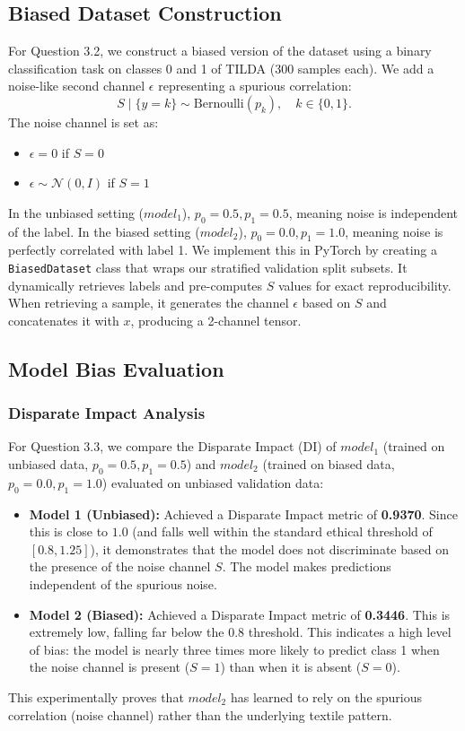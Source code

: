 \documentclass{name}
\begin{document}
\subsection{Biased Dataset Construction}
For Question 3.2, we construct a biased version of the dataset using a binary classification task on classes 0 and 1 of TILDA (300 samples each). We add a noise-like second channel $\epsilon$ representing a spurious correlation:
$$S \mid \{y = k\} \sim \text{Bernoulli}(p_k), \quad k \in \{0, 1\}.$$
The noise channel is set as:
\begin{itemize}
    \item $\epsilon = 0$ if $S = 0$
    \item $\epsilon \sim \mathcal{N}(0, I)$ if $S = 1$
\end{itemize}
In the unbiased setting ($model_1$), $p_0 = 0.5, p_1 = 0.5$, meaning noise is independent of the label. In the biased setting ($model_2$), $p_0 = 0.0, p_1 = 1.0$, meaning noise is perfectly correlated with label 1. We implement this in PyTorch by creating a \texttt{BiasedDataset} class that wraps our stratified validation split subsets. It dynamically retrieves labels and pre-computes $S$ values for exact reproducibility. When retrieving a sample, it generates the channel $\epsilon$ based on $S$ and concatenates it with $x$, producing a 2-channel tensor.

\subsection{Model Bias Evaluation}

\subsubsection{Disparate Impact Analysis}
For Question 3.3, we compare the Disparate Impact (DI) of $model_1$ (trained on unbiased data, $p_0=0.5, p_1=0.5$) and $model_2$ (trained on biased data, $p_0=0.0, p_1=1.0$) evaluated on unbiased validation data:
\begin{itemize}
    \item \textbf{Model 1 (Unbiased):} Achieved a Disparate Impact metric of \textbf{0.9370}. Since this is close to $1.0$ (and falls well within the standard ethical threshold of $[0.8, 1.25]$), it demonstrates that the model does not discriminate based on the presence of the noise channel $S$. The model makes predictions independent of the spurious noise.
    \item \textbf{Model 2 (Biased):} Achieved a Disparate Impact metric of \textbf{0.3446}. This is extremely low, falling far below the $0.8$ threshold. This indicates a high level of bias: the model is nearly three times more likely to predict class 1 when the noise channel is present ($S=1$) than when it is absent ($S=0$).
\end{itemize}
This experimentally proves that $model_2$ has learned to rely on the spurious correlation (noise channel) rather than the underlying textile pattern.
\end{document}
